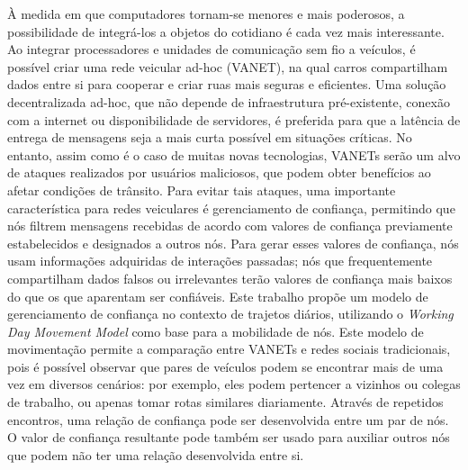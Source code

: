 \begin{resumo}



À medida em que computadores tornam-se menores e mais poderosos, a possibilidade de integrá-los a objetos do cotidiano é cada vez mais interessante.
Ao integrar processadores e unidades de comunicação sem fio a veículos, é possível criar uma rede veicular ad-hoc (VANET), na qual carros compartilham dados entre si para cooperar e criar ruas mais seguras e eficientes.
Uma solução decentralizada ad-hoc, que não depende de infraestrutura pré-existente, conexão com a internet ou disponibilidade de servidores, é preferida para que a latência de entrega de mensagens seja a mais curta possível em situações críticas.
No entanto, assim como é o caso de muitas novas tecnologias, VANETs serão um alvo de ataques realizados por usuários maliciosos, que podem obter benefícios ao afetar condições de trânsito.
Para evitar tais ataques, uma importante característica para redes veiculares é gerenciamento de confiança, permitindo que nós filtrem mensagens recebidas de acordo com valores de confiança previamente estabelecidos e designados a outros nós.
Para gerar esses valores de confiança, nós usam informações adquiridas de interações passadas; nós que frequentemente compartilham dados falsos ou irrelevantes terão valores de confiança mais baixos do que os que aparentam ser confiáveis.
Este trabalho propõe um modelo de gerenciamento de confiança no contexto de trajetos diários, utilizando o \textit{Working Day Movement Model} como base para a mobilidade de nós.
Este modelo de movimentação permite a comparação entre VANETs e redes sociais tradicionais, pois é possível observar que pares de veículos podem se encontrar mais de uma vez em diversos cenários: por exemplo, eles podem pertencer a vizinhos ou colegas de trabalho, ou apenas tomar rotas similares diariamente.
Através de repetidos encontros, uma relação de confiança pode ser desenvolvida entre um par de nós.
O valor de confiança resultante pode também ser usado para auxiliar outros nós que podem não ter uma relação desenvolvida entre si.

\end{resumo}
